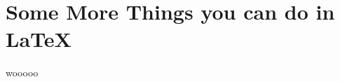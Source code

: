 \documentclass[../main]{subfiles}
\begin{document}
\chapter{Some More Things you can do in \LaTeX}

wooooo
\end{document}
